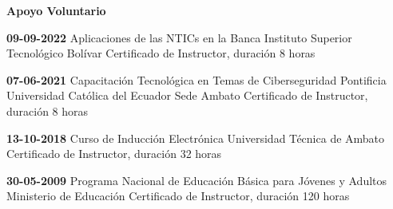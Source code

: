 \pagestyle{empty}
\begin{mainbar}
    \textbf{Apoyo Voluntario}
\end{mainbar}
    
\begin{devent}
    \cvevent
    {\textbf{09-09-2022}}
	{Aplicaciones de las NTICs en la Banca}
	{Instituto Superior Tecnológico Bolívar}
	{Certificado de Instructor, duración 8 horas}
	{}
\end{devent}
\begin{levent}
    \cvevent
	{\textbf{07-06-2021}}
	{Capacitación Tecnológica en Temas de Ciberseguridad}
	{Pontificia Universidad Católica del Ecuador Sede Ambato}
	{Certificado de Instructor, duración 8 horas}
	{}
\end{levent}
\begin{devent}
    \cvevent
	{\textbf{13-10-2018}}
	{Curso de Inducción Electrónica}
	{Universidad Técnica de Ambato}
	{Certificado de Instructor, duración 32 horas}
	{}
\end{devent}

\begin{levent}
    \cvevent
    {\textbf{30-05-2009}}
	{Programa Nacional de Educación Básica para Jóvenes y Adultos}
	{Ministerio de Educación}
	{Certificado de Instructor, duración 120 horas}
	{}
\end{levent}

\newpage
\setlength{\headheight}{15pt}
\pagestyle{fancy}
\fancyhf{}
\rhead[Ponencias]{\rightmark}
\lfoot[\thepage]{}
\rfoot[]{\thepage}

